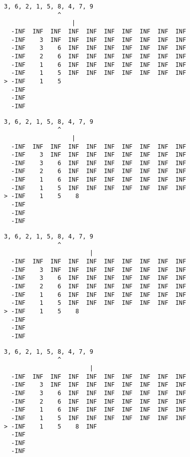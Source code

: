 { \begin{verbatim}
3, 6, 2, 1, 5, 8, 4, 7, 9
               ^
                   |
  -INF  INF  INF  INF  INF  INF  INF  INF  INF  INF
  -INF    3  INF  INF  INF  INF  INF  INF  INF  INF
  -INF    3    6  INF  INF  INF  INF  INF  INF  INF
  -INF    2    6  INF  INF  INF  INF  INF  INF  INF
  -INF    1    6  INF  INF  INF  INF  INF  INF  INF
  -INF    1    5  INF  INF  INF  INF  INF  INF  INF
> -INF    1    5                                   
  -INF                                             
  -INF                                             
  -INF                                             
\end{verbatim} }

{ \begin{verbatim}
3, 6, 2, 1, 5, 8, 4, 7, 9
               ^
                   |
  -INF  INF  INF  INF  INF  INF  INF  INF  INF  INF
  -INF    3  INF  INF  INF  INF  INF  INF  INF  INF
  -INF    3    6  INF  INF  INF  INF  INF  INF  INF
  -INF    2    6  INF  INF  INF  INF  INF  INF  INF
  -INF    1    6  INF  INF  INF  INF  INF  INF  INF
  -INF    1    5  INF  INF  INF  INF  INF  INF  INF
> -INF    1    5    8                              
  -INF                                             
  -INF                                             
  -INF                                             
\end{verbatim} }

{ \begin{verbatim}
3, 6, 2, 1, 5, 8, 4, 7, 9
               ^
                        |
  -INF  INF  INF  INF  INF  INF  INF  INF  INF  INF
  -INF    3  INF  INF  INF  INF  INF  INF  INF  INF
  -INF    3    6  INF  INF  INF  INF  INF  INF  INF
  -INF    2    6  INF  INF  INF  INF  INF  INF  INF
  -INF    1    6  INF  INF  INF  INF  INF  INF  INF
  -INF    1    5  INF  INF  INF  INF  INF  INF  INF
> -INF    1    5    8                              
  -INF                                             
  -INF                                             
  -INF                                             
\end{verbatim} }

{ \begin{verbatim}
3, 6, 2, 1, 5, 8, 4, 7, 9
               ^
                        |
  -INF  INF  INF  INF  INF  INF  INF  INF  INF  INF
  -INF    3  INF  INF  INF  INF  INF  INF  INF  INF
  -INF    3    6  INF  INF  INF  INF  INF  INF  INF
  -INF    2    6  INF  INF  INF  INF  INF  INF  INF
  -INF    1    6  INF  INF  INF  INF  INF  INF  INF
  -INF    1    5  INF  INF  INF  INF  INF  INF  INF
> -INF    1    5    8  INF                         
  -INF                                             
  -INF                                             
  -INF                                             
\end{verbatim} }

